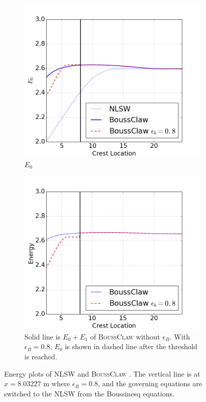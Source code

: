 \documentclass[review]{elsarticle}
\newcommand{\BoussClaw}{\textsc{BoussClaw} }
\begin{document}
\begin{figure}[tbh!]
	\centering
	\begin{subfigure}[t]{0.45\textwidth}
		\includegraphics[width=\textwidth]{_fig/e0_boussclaw_eb08.png}
		\caption{$E_0$}
		\label{fig:e0_boussclaw_eb08}
	\end{subfigure}
	\begin{subfigure}[t]{0.45\textwidth}
		\includegraphics[width=\textwidth]{_fig/e1_boussclaw_eb08.png}
		\caption{Solid line is $E_0+E_1$ of \BoussClaw without $\epsilon_B$.
			With $\epsilon_B=0.8$, $E_0$ is shown in dashed line after the threshold is reached.}
		\label{fig:e1_boussclaw_eb08}
	\end{subfigure}
	\caption{Energy plots of NLSW and \BoussClaw.
		The vertical line is at $x=8.03227$ m where $\epsilon_B=0.8$,
		and the governing equations are switched to the NLSW from
		the Boussinesq equations. }
	\label{fig:energy_boussclaw_swe}
\end{figure}
\end{document}
